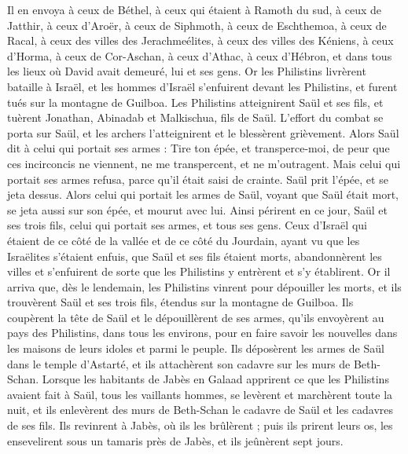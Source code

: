 \begin{multicols}{2}
Il en envoya à ceux de Béthel, à ceux qui étaient à Ramoth du sud, à ceux de Jatthir,
à ceux d'Aroër, à ceux de Siphmoth, à ceux de Eschthemoa,
à ceux de Racal, à ceux des villes des Jerachmeélites, à ceux des villes des Kéniens,
à ceux d'Horma, à ceux de Cor-Aschan, à ceux d'Athac,
à ceux d'Hébron, et dans tous les lieux où David avait demeuré, lui et ses gens.
\VerseOne{}Or les Philistins livrèrent bataille à Israël, et les hommes d'Israël s'enfuirent devant les Philistins, et furent tués sur la montagne de Guilboa.
Les Philistins atteignirent Saül et ses fils, et tuèrent Jonathan, Abinadab et Malkischua, fils de Saül.
L'effort du combat se porta sur Saül, et les archers l'atteignirent et le blessèrent grièvement.
Alors Saül dit à celui qui portait ses armes : Tire ton épée, et transperce-moi, de peur que ces incirconcis ne viennent, ne me transpercent, et ne m'outragent. Mais celui qui portait ses armes refusa, parce qu'il était saisi de crainte. Saül prit l'épée, et se jeta dessus.
Alors celui qui portait les armes de Saül, voyant que Saül était mort, se jeta aussi sur son épée, et mourut avec lui.
Ainsi périrent en ce jour, Saül et ses trois fils, celui qui portait ses armes, et tous ses gens.
Ceux d'Israël qui étaient de ce côté de la vallée et de ce côté du Jourdain, ayant vu que les Israëlites s'étaient enfuis, que Saül et ses fils étaient morts, abandonnèrent les villes et s'enfuirent de sorte que les Philistins y entrèrent et s'y établirent.
Or il arriva que, dès le lendemain, les Philistins vinrent pour dépouiller les morts, et ils trouvèrent Saül et ses trois fils, étendus sur la montagne de Guilboa.
Ils coupèrent la tête de Saül et le dépouillèrent de ses armes, qu’ils envoyèrent au pays des Philistins, dans tous les environs, pour en faire savoir les nouvelles dans les maisons de leurs idoles et parmi le peuple.
Ils déposèrent les armes de Saül dans le temple d'Astarté, et ils attachèrent son cadavre sur les murs de Beth-Schan.
Lorsque les habitants de Jabès en Galaad apprirent ce que les Philistins avaient fait à Saül,
tous les vaillants hommes, se levèrent et marchèrent toute la nuit, et ils enlevèrent des murs de Beth-Schan le cadavre de Saül et les cadavres de ses fils. Ils revinrent à Jabès, où ils les brûlèrent ;
puis ils prirent leurs os, les ensevelirent sous un tamaris près de Jabès, et ils jeûnèrent sept jours.
\PPE{}
\end{multicols}
